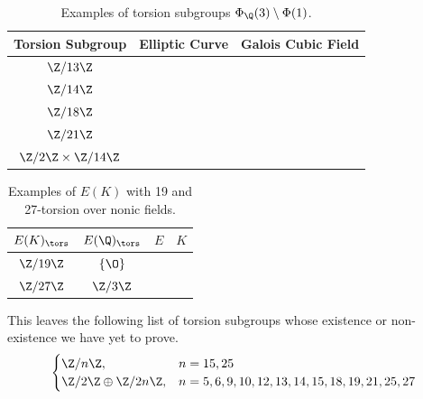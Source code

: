 \begin{frame}[plain,c]
	\begin{table}[!ht]
	\centering
	\caption{Examples of torsion subgroups $\Phi_\Q(3) \setminus \Phi(1)$.\label{tab:3qsm1}}
	\begin{tabular}{ccc} \hline
	Torsion Subgroup & Elliptic Curve & Galois Cubic Field \\ \hline
	$\Z/13\Z$ & \ofsbo{} & \qzetasp{} \\
	$\Z/14\Z$ & \fnat{} & \qzetasp{} \\
	$\Z/18\Z$ & \ofaf{} & \qzetasp{} \\
	$\Z/21\Z$ & \ostbo{} & \qzetanp{} \\
	$\Z/2\Z \times \Z/14\Z$ & \onttco{} & \ttnsoo{}
	\end{tabular}
	\end{table}

        \begin{table}[!ht]
        \centering
        \caption{Examples of $E(K)$ with 19 and 27-torsion over nonic fields.\label{tab:1927tor}}
        \begin{tabular}{cccc} \hline
        $E(K)_\tors$ & $E(\Q)_\tors$ &  $E$ & $K$ \\ \hline
        $\Z/19\Z$ & $\{ \O \}$ & \tsoao{} & \qzetantp{} \\ 
        $\Z/27\Z$ & $\Z/3\Z$ & \tsaf{} & \qzetatsp{}
        \end{tabular}
        \end{table}
\end{frame}





\begin{frame}[plain,c]
This leaves the following list of torsion subgroups whose existence or non-existence we have yet to prove. 
	\[
	\begin{cases}
	\Z/n\Z, & n= 15, 25 \\
	\Z/2\Z \oplus \Z/2n\Z, & n= 5, 6, 9, 10, 12, 13, 14, 15, 18, 19, 21, 25, 27
	\end{cases}
	\]
\end{frame}





